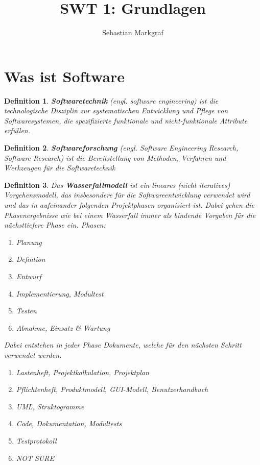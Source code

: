 \documentclass[a4paper]{article}
\title{SWT 1: Grundlagen}
\author{Sebastian Markgraf}
\theoremstyle{break}
\newtheorem{defi}{Definition}[section]
\begin{document}
\maketitle
\section {Was ist Software}
\begin {defi}
  \textbf{Softwaretechnik} (engl. software engineering) ist die technologische Disziplin zur systematischen Entwicklung und Pflege von Softwaresystemen, die spezifizierte funktionale und nicht-funktionale Attribute erfüllen.
\end {defi}

\begin {defi}
  \textbf{Softwareforschung} (engl. Software Engineering Research, Software Research) ist die Bereitstellung von Methoden, Verfahren und Werkzeugen für die Softwaretechnik
\end {defi}


\begin {defi}
  Das \textbf{Wasserfallmodell} ist ein lineares (nicht iteratives) Vorgehensmodell, das insbesondere für die Softwareentwicklung verwendet wird und das in aufeinander folgenden Projektphasen organisiert ist. Dabei gehen die Phasenergebnisse wie bei einem Wasserfall immer als bindende Vorgaben für die nächsttiefere Phase ein.
  Phasen:
  \begin {enumerate}
  \item Planung
  \item Defintion
  \item Entwurf
  \item Implementierung, Modultest
  \item Testen
  \item Abnahme, Einsatz \& Wartung
  \end {enumerate}
  Dabei entstehen in jeder Phase Dokumente, welche für den nächsten Schritt verwendet werden.
  \begin {enumerate}
  \item Lastenheft, Projektkalkulation, Projektplan
  \item Pflichtenheft, Produktmodell, GUI-Modell, Benutzerhandbuch
  \item UML, Struktogramme
  \item Code, Dokumentation, Modultests
  \item Testprotokoll
  \item NOT SURE 
    \end {enumerate}
\end {defi}
\end{document}
